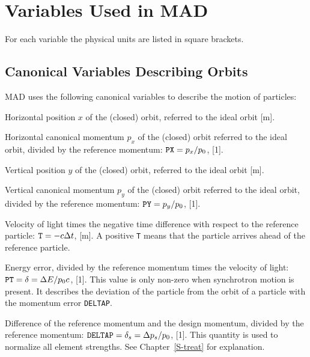 \section{Variables Used in MAD}
\label{S-VARIA}
For each variable the physical units are listed in square brackets.
 
\subsection{Canonical Variables Describing Orbits}
\label{S-CANON}
MAD uses the following canonical variables
to describe the motion of particles:
 
\begin{mylist}
Horizontal position \(x\) of the (closed) orbit,
referred to the ideal orbit [m].
 
Horizontal canonical momentum \(p_{x}\) of the (closed) orbit
referred to the ideal orbit, divided by the reference momentum:
\(\hbox{\tt PX}=p_x/p_0\), [1].
 
Vertical position \(y\) of the (closed) orbit,
referred to the ideal orbit [m].
 
Vertical canonical momentum \(p_{y}\) of the (closed) orbit
referred to the ideal orbit, divided by the reference momentum:
\(\hbox{\tt PY}=p_y/p_0\), [1].
 
Velocity of light times the negative time difference
with respect to the reference particle:
\(\hbox{\tt T}=-c\Delta t\), [m].
A positive {\tt T} means that the particle arrives ahead
of the reference particle.
 
Energy error, divided by the reference momentum times the velocity
of light:
\(\hbox{\tt PT}=\delta =\Delta E/p_{0}c\), [1].
This value is only non-zero when synchrotron motion is present.
It describes the deviation of the particle from the orbit of a
particle with the momentum error {\tt DELTAP}.
 
Difference of the reference momentum and the design momentum,
divided by the reference momentum:
\(\hbox{\tt DELTAP}=\delta_s =\Delta p_s/p_0\), [1].
This quantity is used to normalize all element strengths.
See Chapter~\ref{S-treat} for explanation.
\end{mylist}
 
